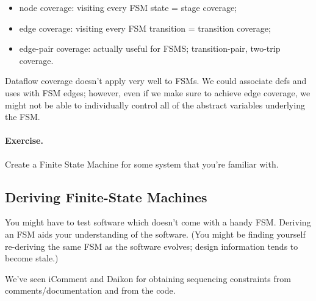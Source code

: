 \documentclass[11pt]{article}
\begin{document}
\begin{itemize}
\item node coverage: visiting every FSM state = stage coverage;
\item edge coverage: visiting every FSM transition = transition coverage;
\item edge-pair coverage: actually useful for FSMS; transition-pair, two-trip coverage.
\end{itemize}

Dataflow coverage doesn't apply very well to FSMs. We could associate
defs and uses with FSM edges; however, even if we make sure to achieve
edge coverage, we might not be able to individually control all of the
abstract variables underlying the FSM.

\paragraph{Exercise.}  Create a Finite State Machine for some system that
you're familiar with.

\subsection*{Deriving Finite-State Machines}
You might have to test software which doesn't come with a handy FSM.
Deriving an FSM aids your understanding of the software. (You might
be finding yourself re-deriving the same FSM as the software evolves;
design information tends to become stale.)

We've seen iComment and Daikon for obtaining sequencing constraints from
comments/documentation and from the code.

\end{document}
